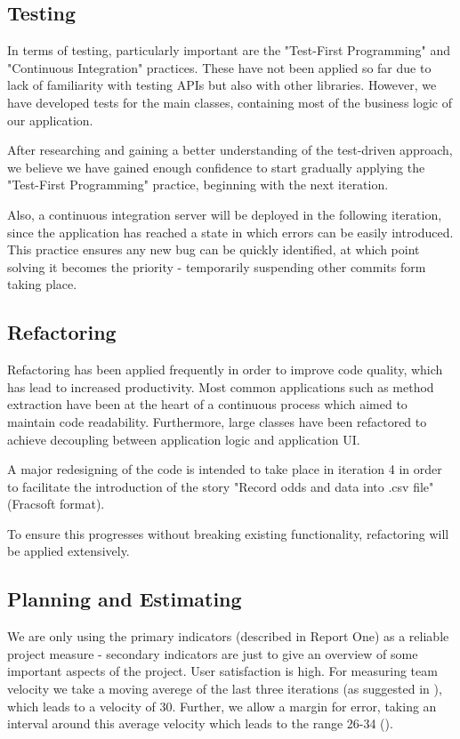 \documentclass[10pt]{report}
\begin{document}
\subsection{Testing}

In terms of testing, particularly important are the "Test-First Programming" and "Continuous Integration" practices. These have not been applied so far due to lack of familiarity with testing APIs but also with other libraries. However, we have developed tests for the main classes, containing most of the business logic of our application.

After researching \cite{testing} and gaining a better understanding of the test-driven approach, we believe we have gained enough confidence to start  gradually applying the "Test-First Programming" practice, beginning with the next iteration.

Also, a continuous integration server will be deployed in the following iteration, since the application has reached a state in which errors can be easily introduced. This practice ensures any new bug can be quickly identified, at which point solving it becomes the priority - temporarily suspending other commits form taking place.

\subsection{Refactoring}

Refactoring has been applied frequently in order to improve code quality, which has lead to increased productivity. Most common applications such as method extraction have been at the heart of a continuous process which aimed to maintain code readability. Furthermore, large classes have been refactored to achieve decoupling between application logic and application UI.

A major redesigning of the code is intended to take place in iteration 4 in order to facilitate the introduction of the story "Record odds and data into .csv file" (Fracsoft format).

To ensure this progresses without breaking existing functionality, refactoring will be applied extensively.

\subsection{Planning and Estimating}
\label{estimating}
We are only using the primary indicators (described in Report One) as a reliable project measure - secondary indicators are just to give an overview of some important aspects of the project.
User satisfaction is high.
For measuring team velocity we take a moving averege of the last three iterations (as suggested in \cite{estim}), which leads to a velocity of 30. Further, we allow a margin for error, taking an interval around this average velocity which leads to the range 26-34 (\cite{estim}).
\end{document}
